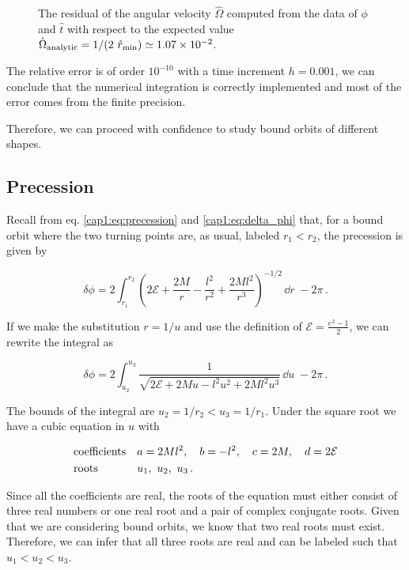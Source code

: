 \begin{figure}[h]
\begin{minipage}{0.48\textwidth}
        \caption{The residual of the angular velocity $\hat \Omega$ computed
        from the data of $\phi$ and $\hat t$ with respect to the expected value 
        $\hat \Omega_{\rm analytic}
        = 1 / (2 ~ \hat r_{\rm min}) \simeq \num{1.07e-2}$.}
        \label{cap2:fig:circ_orbit_res}
    \end{minipage}
\end{figure}

The relative error is of order $10^{-10}$ with a time increment $h = 0.001$, we
can conclude that the numerical integration is correctly implemented and most
of the error comes from the finite precision.

Therefore, we can proceed with confidence to study bound orbits of different
shapes.


\subsection{Precession}

Recall from eq. \ref{cap1:eq:precession} and \ref{cap1:eq:delta_phi} that, for a
bound orbit where the two turning points are, as usual, labeled $r_1 < r_2$, the
precession is given by

\begin{equation}
    \delta \phi = 2 \int_{r_1}^{r_2} \left( 2 \mathcal E + \frac{2M}{r}
    - \frac{l^2}{r^2} + \frac{2Ml^2}{r^3} \right)^{-1/2} \, \dd{r}
    \; - 2 \pi \, .
\end{equation}

If we make the substitution $r = 1 / u$ and use the definition of $\mathcal E
= \frac{e^2 - 1}{2}$, we can rewrite the integral as

\begin{equation}
    \delta \phi = 2 \int_{u_2}^{u_3} \frac{1}{\sqrt{2 \mathcal E + 2Mu - l^2 u^2
    + 2Ml^2 u^3}} \, \dd{u}
    \; - 2 \pi \, .
    \label{cap2:eq:delta_phi}
\end{equation}

The bounds of the integral are $u_2 = 1 / r_2 < u_3 = 1 / r_1$.
Under the square root we have a cubic equation in $u$ with

\begin{align}
    &{\rm coefficients} && a = 2Ml^2, \quad b = -l^2, \quad c = 2M, \quad d = 2 \mathcal E \\
    &{\rm roots}        && u_1, ~ u_2, ~ u_3 \, .
    \label{cap2:eq:cubic_roots}
\end{align}

Since all the coefficients are real, the roots of the equation must either
consist of three real numbers or one real root and a pair of complex conjugate
roots.
Given that we are considering bound orbits, we know that two real roots must
exist.
Therefore, we can infer that all three roots are real and can be labeled such
that $u_1 < u_2 < u_3$.

